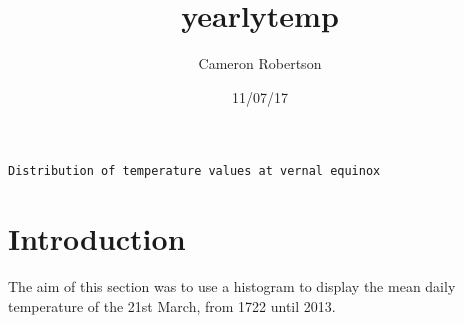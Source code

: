 \documentclass[a4paper,10pt,oneside]{article}
\author{Cameron Robertson}
\title{yearlytemp}
\date{11/07/17}
\begin{document}
 \begin{center}
  \texttt{Distribution of temperature values at vernal equinox}
 \end{center}
 
 \section{Introduction}
 \label{sec:intro}
 
 The aim of this section was to use a histogram to display the mean daily temperature of the 21st March, from 1722 until 2013.
\end{document}
